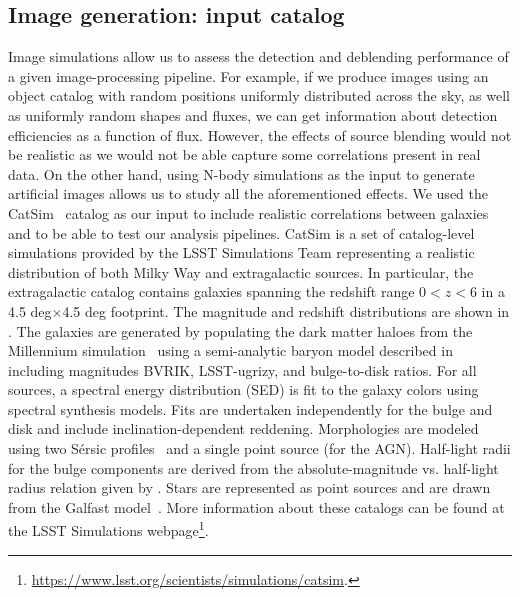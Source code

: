 \documentclass[a4paper,fleqn,usenatbib]{mnras}
\begin{document}
\subsection{Image generation: input catalog}
\label{sec:inputs}
Image simulations allow us to assess the detection and deblending performance of a given image-processing pipeline. For example, if we produce images using an object catalog with random positions uniformly distributed across the sky, as well as uniformly random shapes and fluxes, we can get information about detection efficiencies as a function of flux. However, the effects of source blending would not be realistic as we would not be able capture some correlations present in real data. On the other hand, using N-body simulations as the input to generate artificial images allows us to study all the aforementioned effects. We used the CatSim~\citep{2010SPIE.7738E..1OC,2014SPIE.9150E..14C} catalog as our input to include realistic correlations between galaxies and to be able to test our analysis pipelines. CatSim is a set of catalog-level simulations provided by the LSST Simulations Team representing a realistic distribution of both Milky Way and extragalactic sources. In particular, the extragalactic catalog contains galaxies spanning the redshift range $0 < z < 6$ in a 4.5 deg$\times$4.5 deg footprint. The magnitude and redshift distributions are shown in . The galaxies are generated by populating the dark matter haloes from the Millennium simulation~\citep{2005Nature.435.629S} using a semi-analytic baryon model described in \citet{2006MNRAS.366..499D} including magnitudes BVRIK, LSST-ugrizy, and bulge-to-disk ratios. For all sources, a spectral energy distribution (SED) is fit to the galaxy colors using \citet{2003MNRAS.344.1000B} spectral synthesis models. Fits are undertaken independently for the bulge and disk and include inclination-dependent reddening. Morphologies are modeled using two S\'{e}rsic profiles~\citep{1963BAAA....6...41S} and a single point source (for the AGN). Half-light radii for the bulge components are derived from the absolute-magnitude vs. half-light radius relation given by \citet{2011A&A...534A...3G}. Stars are represented as point sources and are drawn from the Galfast model~\citep{2008ApJ...673..864J}. More information about these catalogs can be found at the LSST Simulations webpage\footnote{\url{https://www.lsst.org/scientists/simulations/catsim}.}.
\end{document}
